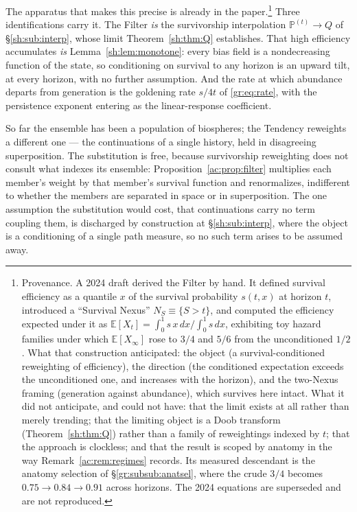 \documentclass[11pt]{article}
\numberwithin{equation}{section}
\theoremstyle{plain}
\theoremstyle{definition}
\theoremstyle{remark}
\newcommand{\E}{\mathbb{E}}
\newcommand{\PP}{\mathbb{P}}
\begin{document}
The apparatus that makes this precise is already in the paper.\footnote{Provenance. A 2024 draft derived the Filter by hand. It defined survival efficiency as a quantile $x$ of the survival probability $s(t,x)$ at horizon $t$, introduced a ``Survival Nexus'' $N_S \equiv \{S > t\}$, and computed the efficiency expected under it as $\E[X_t] = \int_0^1 s\,x\,dx \big/ \int_0^1 s\,dx$, exhibiting toy hazard families under which $\E[X_\infty]$ rose to $3/4$ and $5/6$ from the unconditioned $1/2$. What that construction anticipated: the object (a survival-conditioned reweighting of efficiency), the direction (the conditioned expectation exceeds the unconditioned one, and increases with the horizon), and the two-Nexus framing (generation against abundance), which survives here intact. What it did not anticipate, and could not have: that the limit exists at all rather than merely trending; that the limiting object is a Doob transform (Theorem~\ref{sh:thm:Q}) rather than a family of reweightings indexed by $t$; that the approach is clockless; and that the result is scoped by anatomy in the way Remark~\ref{ac:rem:regimes} records. Its measured descendant is the anatomy selection of \S\ref{gr:subsub:anatsel}, where the crude $3/4$ becomes $0.75 \to 0.84 \to 0.91$ across horizons. The 2024 equations are superseded and are not reproduced.}
Three identifications carry it. The Filter \emph{is} the survivorship interpolation $\PP^{(t)} \to Q$ of \S\ref{sh:sub:interp}, whose limit Theorem~\ref{sh:thm:Q} establishes. That high efficiency accumulates \emph{is} Lemma~\ref{sh:lem:monotone}: every bias field is a nondecreasing function of the state, so conditioning on survival to any horizon is an upward tilt, at every horizon, with no further assumption. And the rate at which abundance departs from generation is the goldening rate $s/4t$ of \eqref{gr:eq:rate}, with the persistence exponent entering as the linear-response coefficient.

So far the ensemble has been a population of biospheres; the Tendency reweights a different one --- the continuations of a single history, held in disagreeing superposition. The substitution is free, because survivorship reweighting does not consult what indexes its ensemble: Proposition~\ref{ac:prop:filter} multiplies each member's weight by that member's survival function and renormalizes, indifferent to whether the members are separated in space or in superposition. The one assumption the substitution would cost, that continuations carry no term coupling them, is discharged by construction at \S\ref{sh:sub:interp}, where the object is a conditioning of a single path measure, so no such term arises to be assumed away.
\end{document}
